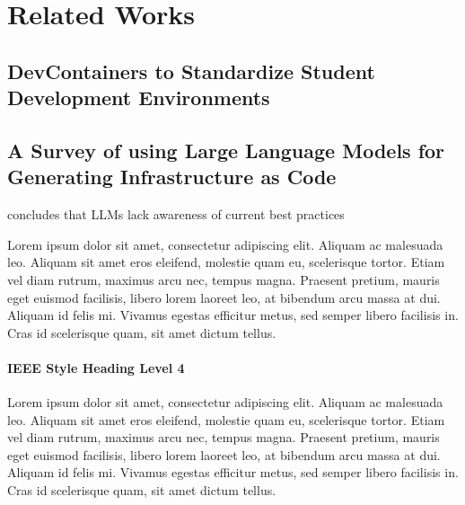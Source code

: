 \chapter{Related Works}\label{chap:litreview}


\section{DevContainers to Standardize Student Development Environments}

\cite{valstarUsingDevContainersStandardize2020}

\section{A Survey of using Large Language Models for Generating Infrastructure as Code}

\cite{srivatsaSurveyUsingLarge} concludes that LLMs lack awareness of current best practices

Lorem  ipsum dolor sit amet, consectetur adipiscing elit. Aliquam ac malesuada leo. Aliquam sit amet eros eleifend, molestie quam eu, scelerisque tortor. Etiam vel diam rutrum, maximus arcu nec, tempus magna. Praesent pretium, mauris eget euismod facilisis, libero lorem laoreet leo, at bibendum arcu massa at dui. Aliquam id felis mi. Vivamus egestas efficitur metus, sed semper libero facilisis in. Cras id scelerisque quam, sit amet dictum tellus.

\subsubsection{IEEE Style Heading Level 4}

Lorem  ipsum dolor sit amet, consectetur adipiscing elit. Aliquam ac malesuada leo. Aliquam sit amet eros eleifend, molestie quam eu, scelerisque tortor. Etiam vel diam rutrum, maximus arcu nec, tempus magna. Praesent pretium, mauris eget euismod facilisis, libero lorem laoreet leo, at bibendum arcu massa at dui. Aliquam id felis mi. Vivamus egestas efficitur metus, sed semper libero facilisis in. Cras id scelerisque quam, sit amet dictum tellus.
